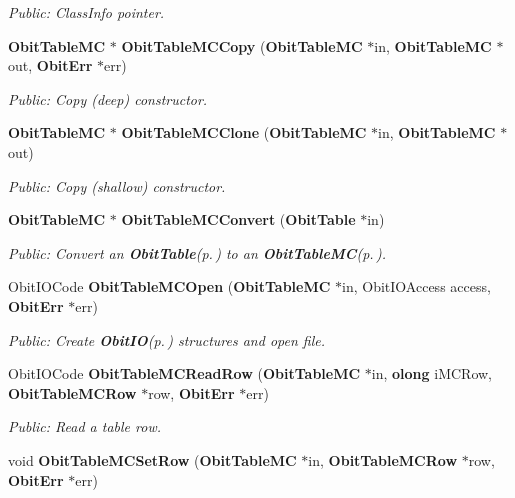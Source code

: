 \begin{CompactItemize}
\begin{CompactList}\small\item\em Public: Class\-Info pointer. \item\end{CompactList}\item 
{\bf Obit\-Table\-MC} $\ast$ {\bf Obit\-Table\-MCCopy} ({\bf Obit\-Table\-MC} $\ast$in, {\bf Obit\-Table\-MC} $\ast$out, {\bf Obit\-Err} $\ast$err)
\begin{CompactList}\small\item\em Public: Copy (deep) constructor. \item\end{CompactList}\item 
{\bf Obit\-Table\-MC} $\ast$ {\bf Obit\-Table\-MCClone} ({\bf Obit\-Table\-MC} $\ast$in, {\bf Obit\-Table\-MC} $\ast$out)
\begin{CompactList}\small\item\em Public: Copy (shallow) constructor. \item\end{CompactList}\item 
{\bf Obit\-Table\-MC} $\ast$ {\bf Obit\-Table\-MCConvert} ({\bf Obit\-Table} $\ast$in)
\begin{CompactList}\small\item\em Public: Convert an {\bf Obit\-Table}{\rm (p.\,\pageref{structObitTable})} to an {\bf Obit\-Table\-MC}{\rm (p.\,\pageref{structObitTableMC})}. \item\end{CompactList}\item 
Obit\-IOCode {\bf Obit\-Table\-MCOpen} ({\bf Obit\-Table\-MC} $\ast$in, Obit\-IOAccess access, {\bf Obit\-Err} $\ast$err)
\begin{CompactList}\small\item\em Public: Create {\bf Obit\-IO}{\rm (p.\,\pageref{structObitIO})} structures and open file. \item\end{CompactList}\item 
Obit\-IOCode {\bf Obit\-Table\-MCRead\-Row} ({\bf Obit\-Table\-MC} $\ast$in, {\bf olong} i\-MCRow, {\bf Obit\-Table\-MCRow} $\ast$row, {\bf Obit\-Err} $\ast$err)
\begin{CompactList}\small\item\em Public: Read a table row. \item\end{CompactList}\item 
void {\bf Obit\-Table\-MCSet\-Row} ({\bf Obit\-Table\-MC} $\ast$in, {\bf Obit\-Table\-MCRow} $\ast$row, {\bf Obit\-Err} $\ast$err)

\end{CompactItemize}
